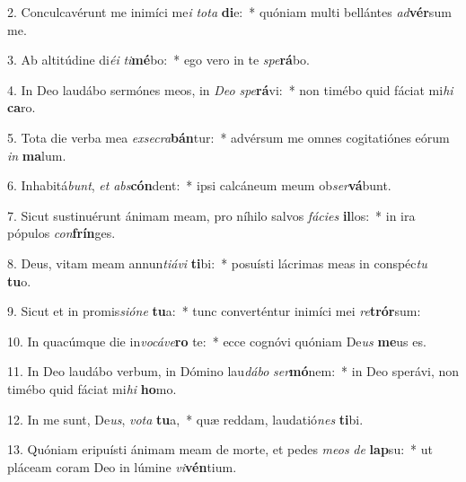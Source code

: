 2. Conculcavérunt me inimíci me\textit{i} \textit{to}\textit{ta} \textbf{di}e:~*  quóniam multi bellántes \textit{ad}\textbf{vér}sum me.\

3. Ab altitúdine di\textit{é}\textit{i} \textit{ti}\textbf{mé}bo:~*  ego vero in te \textit{spe}\textbf{rá}bo.\

4. In Deo laudábo sermónes meos, in \textit{De}\textit{o} \textit{spe}\textbf{rá}vi:~*  non timébo quid fáciat mi\textit{hi} \textbf{ca}ro.\

5. Tota die verba mea \textit{ex}\textit{se}\textit{cra}\textbf{bán}tur:~*  advérsum me omnes cogitatiónes eórum \textit{in} \textbf{ma}lum.\

6. Inhabitá\textit{bunt}, \textit{et} \textit{abs}\textbf{cón}dent:~*  ipsi calcáneum meum ob\textit{ser}\textbf{vá}bunt.\

7. Sicut sustinuérunt ánimam meam, pro níhilo salvos \textit{fá}\textit{ci}\textit{es} \textbf{il}los:~*  in ira pópulos \textit{con}\textbf{frín}ges.\

8. Deus, vitam meam annun\textit{ti}\textit{á}\textit{vi} \textbf{ti}bi:~*  posuísti lácrimas meas in conspéc\textit{tu} \textbf{tu}o.\

9. Sicut et in promis\textit{si}\textit{ó}\textit{ne} \textbf{tu}a:~*  tunc converténtur inimíci mei \textit{re}\textbf{trór}sum:\

10. In quacúmque die in\textit{vo}\textit{cá}\textit{ve}\textbf{ro} te:~*  ecce cognóvi quóniam De\textit{us} \textbf{me}us es.\

11. In Deo laudábo verbum, in Dómino lau\textit{dá}\textit{bo} \textit{ser}\textbf{mó}nem:~*  in Deo sperávi, non timébo quid fáciat mi\textit{hi} \textbf{ho}mo.\

12. In me sunt, De\textit{us}, \textit{vo}\textit{ta} \textbf{tu}a,~*  quæ reddam, laudatió\textit{nes} \textbf{ti}bi.\

13. Quóniam eripuísti ánimam meam de morte, et pedes \textit{me}\textit{os} \textit{de} \textbf{lap}su:~*  ut pláceam coram Deo in lúmine \textit{vi}\textbf{vén}tium.\


